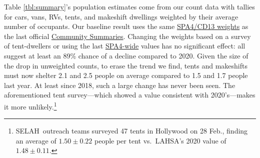 \documentclass[11pt]{article}
\def\resp{respectively}
\def\selah{SELAH}
\def\nh{957\pm94}
\def\ne{556\pm83}
\begin{document}
 Table \ref{tbl:summary}'s population estimates  %
come from our count data with tallies for cars, vans, RVs, tents, and makeshift dwellings weighted by 
their average number of occupants. Our baseline result uses the same %
\href{https://www.lahsa.org/documents?id=4635-usc-2018-2020-multipliers-and-estimates-overview}
{SPA4/CD13 weights} as the last official 
\href{https://www.lahsa.org/documents?id=4686-2020-greater-los-angeles-city-community-homelessness-report-service-planning-area-4.pdf}
{Community Summaries}. 
Changing the weights based on a survey of tent-dwellers or using the last 
\href{https://www.lahsa.org/documents?id=4693-2020-greater-los-angeles-homeless-count-cvrtm-conversion-factors}{SPA4-wide} values has no significant effect:
all suggest at least an 89\% chance of a decline compared to 2020. Given the size of the drop in unweighted 
counts, to erase the trend we find, tents and makeshifts must now shelter 2.1 and 2.5 people on average 
compared to 1.5 and 1.7 people last year. At least since 2018, such a large change has 
never been seen. The aforementioned tent survey---which showed a value 
consistent with 2020's---makes it more unlikely.\footnote{\selah\ outreach teams surveyed 47 tents in 
Hollywood on 28 Feb., finding an average of $1.50\pm0.22$ people per tent vs.~LAHSA's 2020 value 
of $1.48\pm0.11$.}
\end{document}
